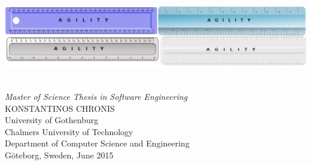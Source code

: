 \begin{titlepage}

\mbox{}
\vfill
\addtolength{\voffset}{2cm}

\includegraphics[scale=0.3]{fig/auxiliary/cover.png}
	
\begin{flushleft}
	{ \\[0.5cm]
\emph{\Large Master of Science Thesis in Software Engineering} \\[.8cm]
	
	{\huge KONSTANTINOS CHRONIS}\\[.8cm]
	
	{\Large University of Gothenburg} \\
	Chalmers University of Technology \\
     Department of Computer Science and Engineering \\
     Göteborg, Sweden, June 2015
  } 
	
\end{flushleft}

\end{titlepage}
\ClearShipoutPicture

\pagestyle{empty}
\newpage
\clearpage

